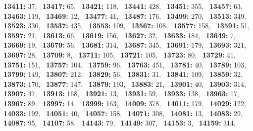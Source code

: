 \textbf{13411:} 37,\allowbreak~ 
\textbf{13417:} 65,\allowbreak~ 
\textbf{13421:} 118,\allowbreak~ 
\textbf{13441:} 428,\allowbreak~ 
\textbf{13451:} 355,\allowbreak~ 
\textbf{13457:} 63,\allowbreak~ 
\textbf{13463:} 119,\allowbreak~ 
\textbf{13469:} 12,\allowbreak~ 
\textbf{13477:} 41,\allowbreak~ 
\textbf{13487:} 176,\allowbreak~ 
\textbf{13499:} 270,\allowbreak~ 
\textbf{13513:} 349,\allowbreak~ 
\textbf{13523:} 330,\allowbreak~ 
\textbf{13537:} 435,\allowbreak~ 
\textbf{13553:} 109,\allowbreak~ 
\textbf{13567:} 108,\allowbreak~ 
\textbf{13577:} 158,\allowbreak~ 
\textbf{13591:} 51,\allowbreak~ 
\textbf{13597:} 21,\allowbreak~ 
\textbf{13613:} 66,\allowbreak~ 
\textbf{13619:} 156,\allowbreak~ 
\textbf{13627:} 32,\allowbreak~ 
\textbf{13633:} 184,\allowbreak~ 
\textbf{13649:} 7,\allowbreak~ 
\textbf{13669:} 19,\allowbreak~ 
\textbf{13679:} 56,\allowbreak~ 
\textbf{13681:} 314,\allowbreak~ 
\textbf{13687:} 345,\allowbreak~ 
\textbf{13691:} 179,\allowbreak~ 
\textbf{13693:} 321,\allowbreak~ 
\textbf{13697:} 28,\allowbreak~ 
\textbf{13709:} 8,\allowbreak~ 
\textbf{13711:} 105,\allowbreak~ 
\textbf{13721:} 105,\allowbreak~ 
\textbf{13723:} 80,\allowbreak~ 
\textbf{13729:} 41,\allowbreak~ 
\textbf{13751:} 151,\allowbreak~ 
\textbf{13757:} 104,\allowbreak~ 
\textbf{13759:} 96,\allowbreak~ 
\textbf{13763:} 451,\allowbreak~ 
\textbf{13781:} 40,\allowbreak~ 
\textbf{13789:} 103,\allowbreak~ 
\textbf{13799:} 149,\allowbreak~ 
\textbf{13807:} 212,\allowbreak~ 
\textbf{13829:} 56,\allowbreak~ 
\textbf{13831:} 31,\allowbreak~ 
\textbf{13841:} 109,\allowbreak~ 
\textbf{13859:} 32,\allowbreak~ 
\textbf{13873:} 170,\allowbreak~ 
\textbf{13877:} 147,\allowbreak~ 
\textbf{13879:} 193,\allowbreak~ 
\textbf{13883:} 21,\allowbreak~ 
\textbf{13901:} 40,\allowbreak~ 
\textbf{13903:} 314,\allowbreak~ 
\textbf{13907:} 47,\allowbreak~ 
\textbf{13913:} 168,\allowbreak~ 
\textbf{13921:} 13,\allowbreak~ 
\textbf{13931:} 59,\allowbreak~ 
\textbf{13933:} 138,\allowbreak~ 
\textbf{13963:} 17,\allowbreak~ 
\textbf{13967:} 89,\allowbreak~ 
\textbf{13997:} 14,\allowbreak~ 
\textbf{13999:} 163,\allowbreak~ 
\textbf{14009:} 378,\allowbreak~ 
\textbf{14011:} 179,\allowbreak~ 
\textbf{14029:} 122,\allowbreak~ 
\textbf{14033:} 192,\allowbreak~ 
\textbf{14051:} 40,\allowbreak~ 
\textbf{14057:} 158,\allowbreak~ 
\textbf{14071:} 308,\allowbreak~ 
\textbf{14081:} 13,\allowbreak~ 
\textbf{14083:} 29,\allowbreak~ 
\textbf{14087:} 95,\allowbreak~ 
\textbf{14107:} 58,\allowbreak~ 
\textbf{14143:} 79,\allowbreak~ 
\textbf{14149:} 307,\allowbreak~ 
\textbf{14153:} 3,\allowbreak~ 
\textbf{14159:} 314,\allowbreak~ 
